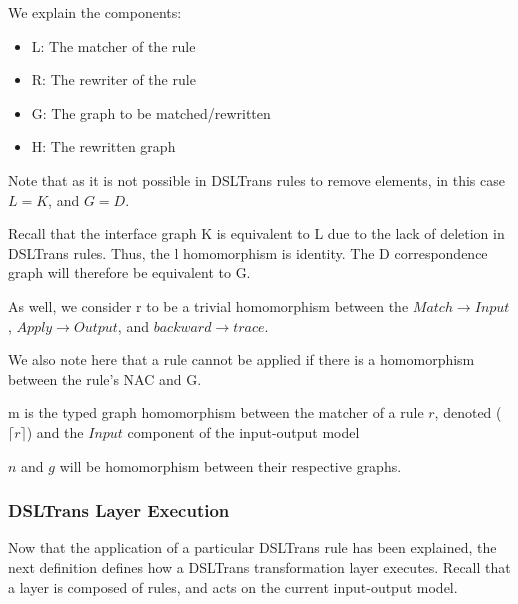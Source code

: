 We explain the components:
\begin{itemize}
\item L: The matcher of the rule
\item R: The rewriter of the rule
\item G: The graph to be matched/rewritten
\item H: The rewritten graph
\end{itemize}

Note that as it is not possible in DSLTrans rules to remove elements, in this case $L = K$, and $G = D$.

Recall that the interface graph K is equivalent to L due to the lack of deletion in DSLTrans rules. Thus, the l homomorphism is identity. The D correspondence graph will therefore be equivalent to G.


As well, we consider r to be a trivial homomorphism between the $\mathit{Match} \rightarrow \mathit{Input}$, $\mathit{Apply} \rightarrow \mathit{Output}$, and $\mathit{backward} \rightarrow \mathit{trace}$.

We also note here that a rule cannot be applied if there is a homomorphism between the rule's NAC and G. 

m is the typed graph homomorphism between the matcher of a rule $r$, denoted ($\lceil r \rceil$) and the $\mathit{Input}$ component of the input-output model

$n$ and $g$ will be homomorphism between their respective graphs. 

\subsubsection*{DSLTrans Layer Execution}

Now that the application of a particular DSLTrans rule has been explained, the next definition defines how a DSLTrans transformation layer executes. Recall that a layer is composed of rules, and acts on the current input-output model.


